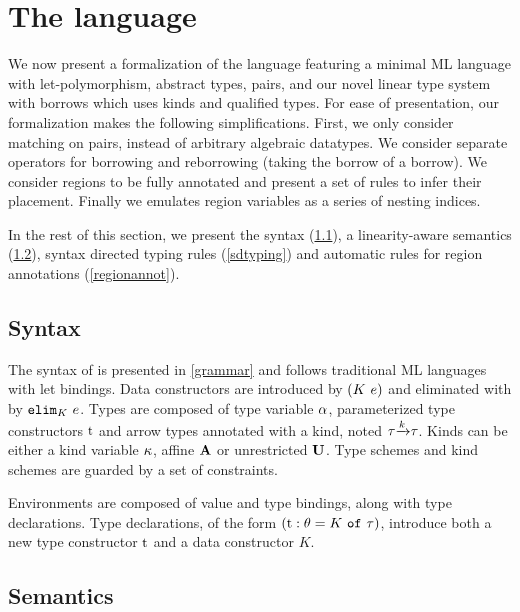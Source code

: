 \section{The \lang language}

We now present a formalization of the \lang language featuring
a minimal ML language with let-polymorphism, abstract types, pairs, and our novel
linear type system with borrows which uses kinds and qualified types.
For ease of presentation,
our formalization makes the following simplifications.
First, we only consider matching on pairs, instead of arbitrary algebraic
datatypes. We consider separate operators for borrowing and reborrowing (taking
the borrow of a borrow). We consider regions to be fully annotated
and present a set of rules to infer their placement.
Finally we emulates region variables
as a series of nesting indices.

In the rest of this section, we present the syntax (\cref{syntax}),
a linearity-aware semantics (\cref{sem}), syntax directed typing rules
(\cref{sdtyping}) and automatic rules for region annotations (\cref{regionannot}).

\subsection{Syntax}
\label{syntax}

The syntax of \lang is presented in \cref{grammar} and follows
traditional ML languages with let bindings.
Data constructors are introduced by $(K\ e)$ and eliminated
with by $\mathtt{elim}_{K}\ e$.
Types are composed of type variable $\alpha$, parameterized type constructors
$\mathrm{t}$ and arrow types annotated with a kind, noted $\tau {\xrightarrow{k}} \tau$.
Kinds can be either a kind variable $\kappa$, affine $\mathbf{A}$ or unrestricted $\mathbf{U}$.
Type schemes and kind schemes are guarded by a set of constraints.

Environments are composed of value and type bindings, along with type
declarations. Type declarations, of the form
$(\mathrm{t} : \theta = K\ \mathtt{of}\ \tau)$, introduce both a new type constructor $\mathrm{t}$ and
a data constructor $K$.

\begin{figure*}[t]
  \centering
  
  \caption{Syntax}
  \label{grammar}
\end{figure*}


\clearpage
\subsection{Semantics}
\label{sem}

